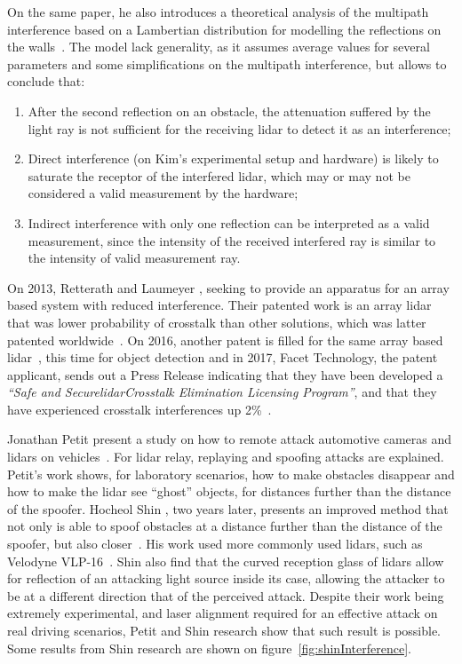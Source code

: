 On the same paper, he also introduces a theoretical analysis of the multipath interference based on a Lambertian distribution for modelling the reflections on the walls~\cite{Kim2017}. The model lack generality, as it assumes average values for several parameters and some simplifications on the multipath interference, but allows to conclude that:

\begin{enumerate}
	\item After the second reflection on an obstacle, the attenuation suffered by the light ray is not sufficient for the receiving \ac{lidar} to detect it as an interference;
	\item Direct interference (on Kim's experimental setup and hardware) is likely to saturate the receptor of the interfered \ac{lidar}, which may or may not be considered a valid measurement by the hardware;
	\item Indirect interference with only one reflection can be interpreted as a valid measurement, since the intensity of the received interfered ray is similar to the intensity of valid measurement ray.
\end{enumerate}

On 2013, Retterath and Laumeyer \cite{Retterath2015}, seeking to provide an apparatus for an array based system with reduced interference. Their patented work is an array \ac{lidar} that was lower probability of crosstalk than other solutions, which was latter patented worldwide~\cite{Retterath2015WO}. On 2016, another patent is filled for the same array based \ac{lidar}~\cite{Retterath2016}, this time for object detection and in 2017, Facet Technology, the patent applicant, sends out a Press Release indicating that they have been developed a \textit{``Safe and Secure\acs{lidar}\textregistered Crosstalk Elimination Licensing Program''}, and that they have experienced crosstalk interferences up 2\%~\cite{Facet}.

Jonathan Petit \etal present a study on how to remote attack automotive cameras and \acp{lidar} on vehicles~\cite{Petit2015}. For \ac{lidar} relay, replaying and spoofing attacks are explained. Petit's work shows, for laboratory scenarios, how to make obstacles disappear and how to make the \ac{lidar} see ``ghost'' objects, for distances further than the distance of the spoofer. Hocheol Shin \etal, two years later, presents an improved method that not only is able to spoof obstacles at a distance further than the distance of the spoofer, but also closer~\cite{Shin2017}. His work used more commonly used \acp{lidar}, such as Velodyne VLP-16~\cite{vlp16}. Shin \etal also find that the curved reception glass of \acp{lidar} allow for reflection of an attacking light source inside its case, allowing the attacker to be at a different direction that of the perceived attack. Despite their work being extremely experimental, and laser alignment required for an effective attack on real driving scenarios, Petit \etal and Shin \etal research show that such result is possible. Some results from Shin research are shown on figure~\ref{fig:shinInterference}.

